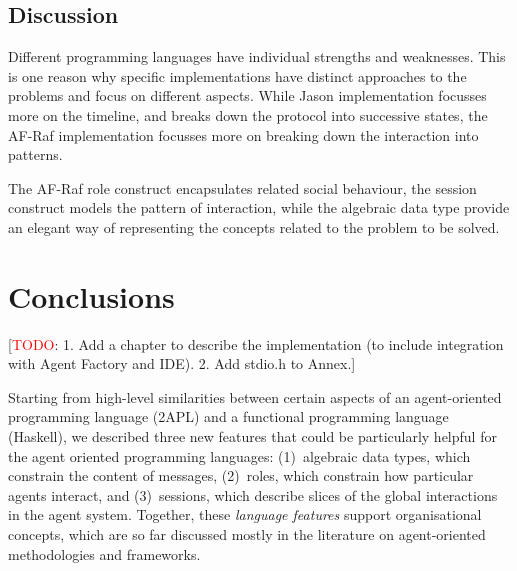 \documentclass[a4paper,12pt,oneside,fleqn]{book} %
\newcommand{\todo}[1]{[\textcolor{red}{TODO}: #1]}
\begin{document}




\section{Discussion} %
Different programming languages have individual strengths and weaknesses.
This is one reason why specific implementations have distinct approaches to
the problems and focus on different aspects. While Jason implementation
focusses more on the timeline, and breaks down the protocol into successive
states, the AF-Raf implementation focusses more on breaking down the
interaction into patterns.

The AF-Raf role construct encapsulates related social behaviour, the
session construct models the pattern of interaction, while the algebraic
data type provide an elegant way of representing the concepts related to
the problem to be solved. 

\chapter{Conclusions}\label{ch:conc} %

\todo{1. Add a chapter to describe the implementation (to include integration
with Agent Factory and IDE). 2. Add stdio.h to Annex.}

Starting from high-level similarities between certain aspects of an
agent-oriented programming language (2APL) and a functional programming
language (Haskell), we described three new features that could be
particularly helpful for the agent oriented programming languages:
(1)~algebraic data types, which constrain the content of messages,
(2)~roles, which constrain how particular agents interact, and
(3)~sessions, which describe slices of the global interactions in the agent
system. Together, these \emph{language features} support organisational
concepts, which are so far discussed mostly in the literature on
agent-oriented methodologies and frameworks.
\end{document}
